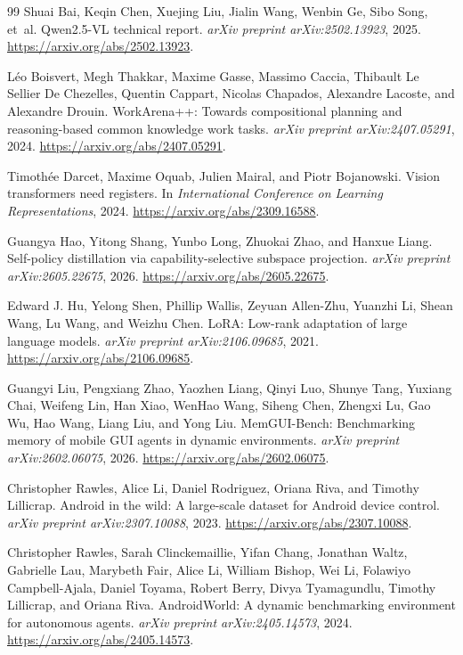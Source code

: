 \documentclass{article}
\begin{document}
\begin{thebibliography}{99}
Shuai Bai, Keqin Chen, Xuejing Liu, Jialin Wang, Wenbin Ge, Sibo Song, et~al.
Qwen2.5-VL technical report. \emph{arXiv preprint arXiv:2502.13923}, 2025.
\url{https://arxiv.org/abs/2502.13923}.

L\'eo Boisvert, Megh Thakkar, Maxime Gasse, Massimo Caccia, Thibault Le Sellier De Chezelles, Quentin Cappart, Nicolas Chapados, Alexandre Lacoste, and Alexandre Drouin.
WorkArena++: Towards compositional planning and reasoning-based common knowledge work tasks.
\emph{arXiv preprint arXiv:2407.05291}, 2024.
\url{https://arxiv.org/abs/2407.05291}.

Timoth\'ee Darcet, Maxime Oquab, Julien Mairal, and Piotr Bojanowski.
Vision transformers need registers. In \emph{International Conference on Learning Representations}, 2024.
\url{https://arxiv.org/abs/2309.16588}.

Guangya Hao, Yitong Shang, Yunbo Long, Zhuokai Zhao, and Hanxue Liang.
Self-policy distillation via capability-selective subspace projection.
\emph{arXiv preprint arXiv:2605.22675}, 2026.
\url{https://arxiv.org/abs/2605.22675}.

Edward J. Hu, Yelong Shen, Phillip Wallis, Zeyuan Allen-Zhu, Yuanzhi Li, Shean Wang, Lu Wang, and Weizhu Chen.
LoRA: Low-rank adaptation of large language models.
\emph{arXiv preprint arXiv:2106.09685}, 2021.
\url{https://arxiv.org/abs/2106.09685}.

Guangyi Liu, Pengxiang Zhao, Yaozhen Liang, Qinyi Luo, Shunye Tang, Yuxiang Chai, Weifeng Lin, Han Xiao, WenHao Wang, Siheng Chen, Zhengxi Lu, Gao Wu, Hao Wang, Liang Liu, and Yong Liu.
MemGUI-Bench: Benchmarking memory of mobile GUI agents in dynamic environments.
\emph{arXiv preprint arXiv:2602.06075}, 2026.
\url{https://arxiv.org/abs/2602.06075}.

Christopher Rawles, Alice Li, Daniel Rodriguez, Oriana Riva, and Timothy Lillicrap.
Android in the wild: A large-scale dataset for Android device control.
\emph{arXiv preprint arXiv:2307.10088}, 2023.
\url{https://arxiv.org/abs/2307.10088}.

Christopher Rawles, Sarah Clinckemaillie, Yifan Chang, Jonathan Waltz, Gabrielle Lau, Marybeth Fair, Alice Li, William Bishop, Wei Li, Folawiyo Campbell-Ajala, Daniel Toyama, Robert Berry, Divya Tyamagundlu, Timothy Lillicrap, and Oriana Riva.
AndroidWorld: A dynamic benchmarking environment for autonomous agents.
\emph{arXiv preprint arXiv:2405.14573}, 2024.
\url{https://arxiv.org/abs/2405.14573}.


\end{thebibliography}
\end{document}
